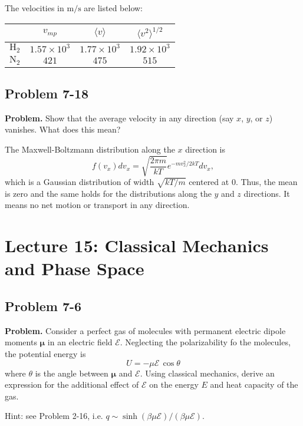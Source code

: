\documentclass[twocolumn, 10pt]{article}
\numberwithin{equation}{section}
\newenvironment{problem}
{\par\medskip \color{problue}
  \textbf{Problem. }\ignorespaces}
{\medskip}
\newenvironment{solution}[1][\empty]
{\par\medskip\sffamily
  \textbf{\ifx\empty#1{Solution.}\relax\else{#1}\fi} \ignorespaces}
{\medskip}
\begin{document}
\begin{solution}
The velocities in $\mathrm{m/s}$ are listed below:
\begin{table}[h]\centering
  \def\arraystretch{1.2}\tabcolsep=7pt
\begin{tabular}{c | c c c}
  \hline \hline
  & $v_{mp}$  & $\langle v \rangle$ & $\langle v^2 \rangle^{1/2}$\\
  \hline
  $\mathrm H_2$ &
  $1.57\times10^3$ &
  $1.77\times10^3$ &
  $1.92\times10^3$\\
  \hline
  $\mathrm N_2$ &
  $421$ &
  $475$ &
  $515$ \\
  \hline \hline
\end{tabular}
\end{table}
\end{solution}

\subsection{Problem 7-18}

\begin{problem}
  Show that the average velocity in any direction
  (say $x$, $y$, or $z$) vanishes.
  What does this mean?
\end{problem}

\begin{solution}
  The Maxwell-Boltzmann distribution along the $x$ direction is
  $$
  f(v_x) d v_x = \sqrt{\frac{2\pi m }{kT}} e^{-m v_x^2/2kT} d v_x,
  $$
  which is a Gaussian distribution of width $\sqrt{kT/m}$
  centered at $0$.
  Thus, the mean is zero
  and the same holds for the distributions
  along the $y$ and $z$ directions.
  It means no net motion or transport in any direction.
\end{solution}

\section{Lecture 15: Classical Mechanics and Phase Space}

\subsection{Problem 7-6}

\begin{problem}
  Consider a perfect gas of molecules
  with permanent electric dipole moments $\pmb\mu$
  in an electric field $\mathscr E$.
  Neglecting the polarizability fo the molecules,
  the potential energy is
  \begin{equation}
    U = -\mu \mathscr E \, \cos\theta
    \label{eq:U_muE}
  \end{equation}
  where $\theta$ is the angle between $\pmb\mu$
  and $\mathscr E$.
  Using classical mechanics,
  derive an expression for the additional effect of $\mathscr E$
  on the energy $E$ and heat capacity of the gas.

  Hint: see Problem 2-16, i.e.
  $q \sim \sinh(\beta \mu \mathscr E)/(\beta \mu \mathscr E)$.
\end{problem}
\end{document}
